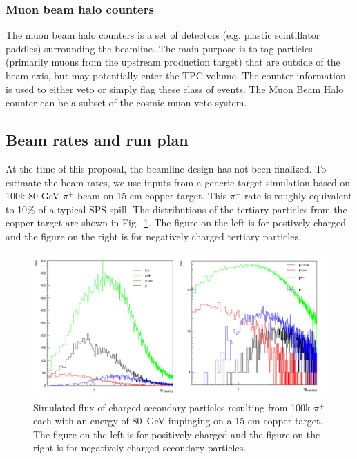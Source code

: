 \subsubsection{Muon beam halo counters}
The muon beam halo counters is a set of detectors (e.g. plastic scintillator paddles) surrounding the beamline. The main purpose is to tag particles (primarily muons from the upstream production target) that are outside of the beam axis, but may potentially enter the TPC volume. The counter information is used to either veto or simply flag these class of events. The Muon Beam Halo counter can be a subset of the cosmic muon veto system. 



\subsection{Beam rates and run plan}
At the time of this proposal, the beamline design has not been finalized. To estimate the beam rates, we use inputs from a generic target simulation based on 100k 80 GeV $\pi^+$ beam on 15 cm copper target. This $\pi^+$ rate is roughly equivalent to 10\% of a typical SPS spill. The distributions of the tertiary particles from the copper target are shown in Fig.~\ref{fig:PionOnCuTarget}. The figure on the left is for postively charged and the figure on the right is for negatively charged tertiary particles. 

\begin{figure}[tbh]
  \centering
\includegraphics[scale=0.47]{figures/80GeVPion-15cmCuTarget.jpg}
  \caption{Simulated flux of charged secondary particles resulting from 100k $\pi^+$ each with an energy of 80~GeV impinging on a 15 cm copper target. The figure on the left is for positively charged and the figure on the right is for negatively charged secondary particles.}
\label{fig:PionOnCuTarget}
\end{figure}

